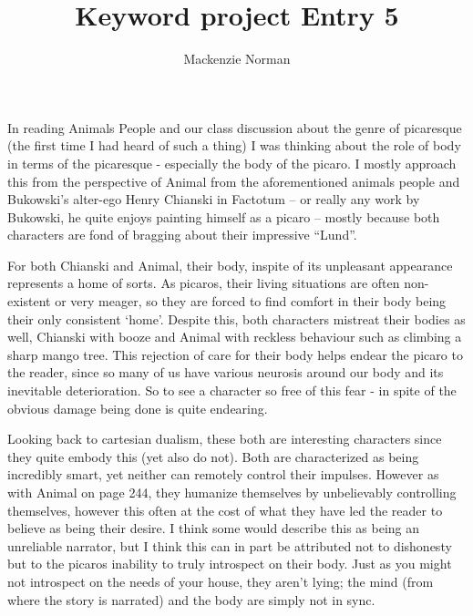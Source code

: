 \documentclass{article}
\title{Keyword project Entry 5}
\author{Mackenzie Norman}
\begin{document}
\maketitle

In reading Animals People and our class discussion about the genre of picaresque (the first time I had heard of such a thing) I was thinking about the role of body in terms of the picaresque - especially the body of the picaro. I mostly approach this from the perspective of Animal from the aforementioned animals people and Bukowski's alter-ego Henry Chianski in Factotum -- or really any work by Bukowski, he quite enjoys painting himself as a picaro -- mostly because both characters are fond of bragging about their impressive ``Lund''. 

For both Chianski and Animal, their body, inspite of its unpleasant appearance represents a home of sorts. As picaros, their living situations are often non-existent or very meager, so they are forced to find comfort in their body being their only consistent `home'. Despite this, both characters mistreat their bodies as well, Chianski with booze and Animal with reckless behaviour such as climbing a sharp mango tree. This rejection of care for their body helps endear the picaro to the reader, since so many of us have various neurosis around our body and its inevitable deterioration. So to see a character so free of this fear - in spite of the obvious damage being done is quite endearing. 

Looking back to cartesian dualism, these both are interesting characters since they quite embody this (yet also do not). Both are characterized as being incredibly smart, yet neither can remotely control their impulses. However as with Animal on page 244, they humanize themselves by unbelievably controlling themselves, however this often at the cost of what they have led the reader to believe as being their desire. I think some would describe this as being an unreliable narrator, but I think this can in part be attributed not to dishonesty but to the picaros inability to truly introspect on their body. Just as you might not introspect on the needs of your house, they aren't lying; the mind (from where the story is narrated) and the body are simply not in sync. 
\end{document}
